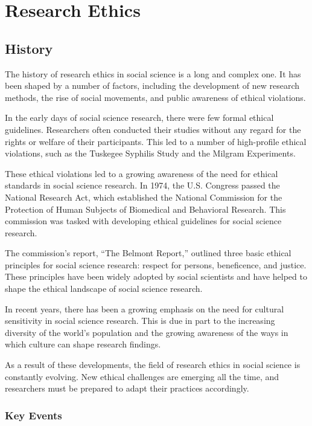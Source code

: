 \documentclass[
  b5paper]{book}
\begin{document}
\hypertarget{research-ethics-1}{%
\chapter{Research Ethics}\label{research-ethics-1}}

\hypertarget{history}{%
\section{History}\label{history}}

The history of research ethics in social science is a long and complex one. It has been shaped by a number of factors, including the development of new research methods, the rise of social movements, and public awareness of ethical violations.

In the early days of social science research, there were few formal ethical guidelines. Researchers often conducted their studies without any regard for the rights or welfare of their participants. This led to a number of high-profile ethical violations, such as the Tuskegee Syphilis Study and the Milgram Experiments.

These ethical violations led to a growing awareness of the need for ethical standards in social science research. In 1974, the U.S. Congress passed the National Research Act, which established the National Commission for the Protection of Human Subjects of Biomedical and Behavioral Research. This commission was tasked with developing ethical guidelines for social science research.

The commission's report, ``The Belmont Report,'' outlined three basic ethical principles for social science research: respect for persons, beneficence, and justice. These principles have been widely adopted by social scientists and have helped to shape the ethical landscape of social science research.

In recent years, there has been a growing emphasis on the need for cultural sensitivity in social science research. This is due in part to the increasing diversity of the world's population and the growing awareness of the ways in which culture can shape research findings.

As a result of these developments, the field of research ethics in social science is constantly evolving. New ethical challenges are emerging all the time, and researchers must be prepared to adapt their practices accordingly.

\hypertarget{key-events}{%
\subsection*{Key Events}\label{key-events}}
\end{document}
